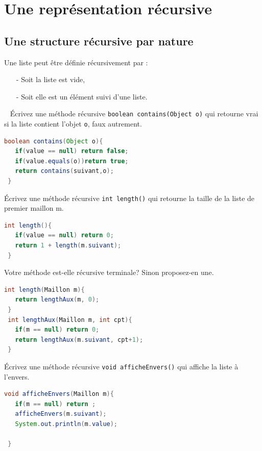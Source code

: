\documentclass[iutinfo,a4paper,nocorrections,10pt]{ustl-tdtp}
\begin{document}
\section{Une représentation récursive}
\subsection{Une structure récursive par nature}

Une liste peut être définie récursivement par :
\begin{itemize}
\item[-]Soit la liste est vide,
\item[-]Soit elle est un élément suivi d'une liste.
\end{itemize}
~
\question Écrivez une méthode récursive \texttt{boolean contains(Object o)} qui retourne vrai si la liste contient l'objet \texttt{o}, faux autrement. 

\begin{correction}
{\color{red}
\begin{lstlisting}[language=Java]
 boolean contains(Object o){
   if(value == null) return false;
   if(value.equals(o))return true;
   return contains(suivant,o);
 }
\end{lstlisting}
}
\end{correction}


\question Écrivez une méthode récursive \texttt{int length()} qui retourne la taille de la liste de premier maillon m.

\begin{correction}
{\color{red}
\begin{lstlisting}[language=Java]
 int length(){
   if(value == null) return 0;
   return 1 + length(m.suivant);
 }
\end{lstlisting}
}
\end{correction}

\question Votre méthode est-elle récursive terminale? Sinon proposez-en une. 

\begin{correction}
{\color{red}
\begin{lstlisting}[language=Java]
 int length(Maillon m){
   return lengthAux(m, 0);
 }
 int lengthAux(Maillon m, int cpt){
   if(m == null) return 0;
   return lengthAux(m.suivant, cpt+1);
 }
\end{lstlisting}
}
\end{correction}

\question Écrivez une méthode récursive \texttt{void afficheEnvers()} qui affiche la liste à l'envers.

\begin{correction}
{\color{red}
\begin{lstlisting}[language=Java]
 void afficheEnvers(Maillon m){
   if(m == null) return ;
   afficheEnvers(m.suivant);
   System.out.println(m.value);

 }
\end{lstlisting}
}
\end{correction}
\end{document}
